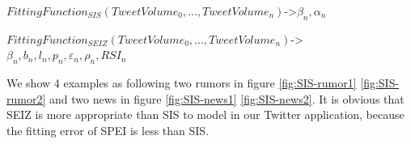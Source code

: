 $FittingFunction_{SIS}(TweetVolume_{0},...,TweetVolume_{n})$->$\beta_{n},\alpha_{n}$%


$FittingFunction_{SEIZ}(TweetVolume_{0},...,TweetVolume_{n})$->$\beta_{n},b_{n},l_{n},p_{n},\varepsilon_{n},\rho_{n},RSI_{n}$

 We show 4 examples as following two rumors in figure \ref{fig:SIS-rumor1} \ref{fig:SIS-rumor2} and two news in figure \ref{fig:SIS-news1}  \ref{fig:SIS-news2}. It is obvious that SEIZ is more appropriate than SIS to model in our Twitter application, because the fitting error of SPEI is less than SIS. 


\begin{figure}[!h]

  \centering

\end{figure}
